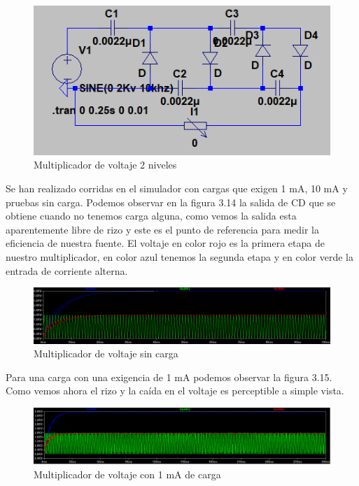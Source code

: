 \begin{figure}[H]
\centering
\includegraphics[width=12cm]{Capitulo3/figs/multi.png}
\caption{Multiplicador de voltaje 2 niveles}
\end{figure}

Se han realizado corridas en el simulador con cargas que exigen 1 mA, 10 mA y pruebas sin carga. Podemos observar en la figura 3.14 la salida de CD que se obtiene cuando no tenemos carga alguna, como vemos la salida esta aparentemente libre de rizo y este es el punto de referencia para medir la eficiencia de nuestra fuente. El voltaje en color rojo es la primera etapa de nuestro multiplicador, en color azul tenemos la segunda etapa y en color verde la entrada de corriente alterna. 

\begin{figure}[H]
\centering
\includegraphics[width=12cm]{Capitulo3/figs/4kv.png}
\caption{Multiplicador de voltaje sin carga}
\end{figure}


Para una carga con una exigencia de 1 mA podemos observar la figura 3.15. Como vemos ahora el rizo y la caída en el voltaje es perceptible a simple vista.


\begin{figure}[H]
\centering
\includegraphics[width=12cm]{Capitulo3/figs/1ma.png}
\caption{Multiplicador de voltaje con 1 mA de carga}
\end{figure}

